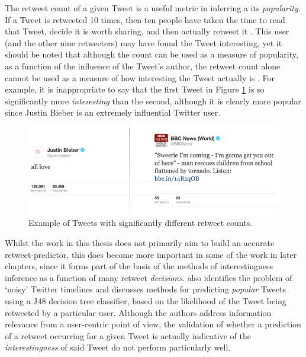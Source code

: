 The retweet count of a given Tweet is a useful metric in inferring a its \textit{popularity}. If a Tweet is retweeted 10 times, then ten people have taken the time to read that Tweet, decide it is worth sharing, and then actually retweet it \cite{uysal11}. This user (and the other nine retweeters) may have found the Tweet interesting, yet it should be noted that although the count can be used as a measure of popularity, as a function of the influence of the Tweet's author, the retweet count alone cannot be used as a measure of how interesting the Tweet actually is \cite{naveed11}. For example, it is inappropriate to say that the first Tweet in Figure \ref{fig:tweet_comparison} is so significantly more \textit{interesting} than the second, although it is clearly more popular since Justin Bieber is an extremely influential Twitter user.

\begin{figure}[h]
\centering
\includegraphics[scale=0.55]{2.Background/Media/compared_tweets.png} 
\caption{Example of Tweets with significantly different retweet counts.}
\label{fig:tweet_comparison}
\end{figure}

Whilst the work in this thesis does not primarily aim to build an accurate retweet-predictor, this does become more important in some of the work in later chapters, since it forms part of the basis of the methods of interestingness inference as a function of many retweet \textit{decisions}. \cite{uysal11} also identifies the problem of `noisy' Twitter timelines and discusses methods for predicting \textit{popular} Tweets using a J48 decision tree classifier, based on the likelihood of the Tweet being retweeted by a particular user. Although the authors address information relevance from a user-centric point of view, the validation of whether a prediction of a retweet occurring for a given Tweet is actually indicative of the \textit{interestingness} of said Tweet do not perform particularly well.

